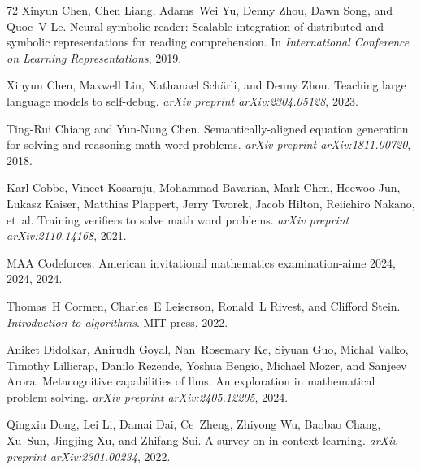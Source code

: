 \begin{thebibliography}{72}
Xinyun Chen, Chen Liang, Adams~Wei Yu, Denny Zhou, Dawn Song, and Quoc~V Le.
\newblock Neural symbolic reader: Scalable integration of distributed and symbolic representations for reading comprehension.
\newblock In \emph{International Conference on Learning Representations}, 2019.

Xinyun Chen, Maxwell Lin, Nathanael Sch{\"a}rli, and Denny Zhou.
\newblock Teaching large language models to self-debug.
\newblock \emph{arXiv preprint arXiv:2304.05128}, 2023.

Ting-Rui Chiang and Yun-Nung Chen.
\newblock Semantically-aligned equation generation for solving and reasoning math word problems.
\newblock \emph{arXiv preprint arXiv:1811.00720}, 2018.

Karl Cobbe, Vineet Kosaraju, Mohammad Bavarian, Mark Chen, Heewoo Jun, Lukasz Kaiser, Matthias Plappert, Jerry Tworek, Jacob Hilton, Reiichiro Nakano, et~al.
\newblock Training verifiers to solve math word problems.
\newblock \emph{arXiv preprint arXiv:2110.14168}, 2021.

MAA Codeforces.
\newblock American invitational mathematics examination-aime 2024, 2024, 2024.

Thomas~H Cormen, Charles~E Leiserson, Ronald~L Rivest, and Clifford Stein.
\newblock \emph{Introduction to algorithms}.
\newblock MIT press, 2022.

Aniket Didolkar, Anirudh Goyal, Nan~Rosemary Ke, Siyuan Guo, Michal Valko, Timothy Lillicrap, Danilo Rezende, Yoshua Bengio, Michael Mozer, and Sanjeev Arora.
\newblock Metacognitive capabilities of llms: An exploration in mathematical problem solving.
\newblock \emph{arXiv preprint arXiv:2405.12205}, 2024.

Qingxiu Dong, Lei Li, Damai Dai, Ce~Zheng, Zhiyong Wu, Baobao Chang, Xu~Sun, Jingjing Xu, and Zhifang Sui.
\newblock A survey on in-context learning.
\newblock \emph{arXiv preprint arXiv:2301.00234}, 2022.


\end{thebibliography}
